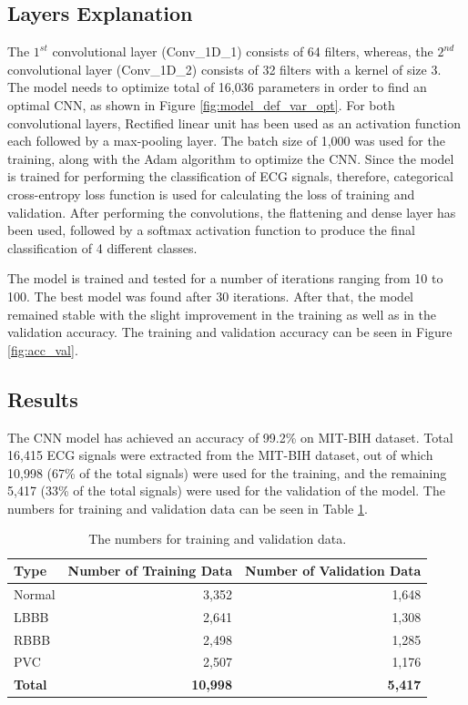 \subsection{Layers Explanation}
The $1^{st}$ convolutional layer (Conv\_1D\_1) consists of 64 filters, whereas, the $2^{nd}$ convolutional layer (Conv\_1D\_2) consists of 32 filters with a kernel of size 3. The model needs to optimize total of 16,036 parameters in order to find an optimal CNN, as shown in Figure \ref{fig:model_def_var_opt}. For both convolutional layers, Rectified linear unit has been used as an activation function each followed by a max-pooling layer. The batch size of 1,000 was used for the training, along with the Adam algorithm to optimize the CNN. Since the model is trained for performing the classification of ECG signals, therefore, categorical cross-entropy loss function is used for calculating the loss of training and validation. After performing the convolutions, the flattening and dense layer has been used, followed by a softmax activation function to produce the final classification of 4 different classes.


The model is trained and tested for a number of iterations ranging from 10 to 100. The best model was found after 30 iterations. After that, the model remained stable with the slight improvement in the training as well as in the validation accuracy. The training and validation accuracy can be seen in Figure \ref{fig:acc_val}.



\subsection{Results}
The CNN model has achieved an accuracy of 99.2\% on MIT-BIH dataset. Total 16,415 ECG signals were extracted from the MIT-BIH dataset, out of which 10,998 (67\% of the total signals) were used for the training, and the remaining 5,417 (33\% of the total signals) were used for the validation of the model. The numbers for training and validation data can be seen in Table \ref{tab:train_count}. 

\renewcommand{\arraystretch}{2}
\begin{table}
	\caption{The numbers for training and validation data.} \label{tab:train_count}
	
	\begin{center}
		\begin{tabular}{ | l | r | r | }
			\hline
			\textbf{Type} & \textbf{Number of Training Data} & \textbf{Number of Validation Data}  \\ \hline
			Normal & 3,352 & 1,648\\ \hline
			LBBB  & 2,641 & 1,308  \\ \hline
			RBBB  & 2,498 & 1,285 \\ \hline
			PVC  & 2,507  & 1,176\\ \hline
			\textbf{Total}  & \textbf{10,998} &  \textbf{5,417} \\ \hline
		\end{tabular}
	\end{center}
	
\end{table}

